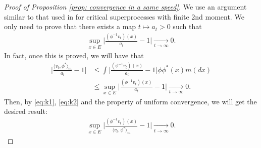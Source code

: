 \documentclass[12pt,a4paper]{amsart}
\theoremstyle{definition}
\numberwithin{equation}{section}
\begin{document}
\begin{proof}
  [Proof of Proposition \ref{prop: convergence in a same speed}]
	We use an argument similar to that used in \cite{RenSongSun2017Spine} for critical superprocesses with finite 2nd moment.
  We only need to prove that there exists a map $t\mapsto a_t > 0$ such that
  \begin{align}
    \label{eq:k1}
    \sup_{x\in E} \Big| \frac{ ( \phi^{-1} v_t )(x)}{ a_t} - 1 \Big|
    \xrightarrow[t\to \infty]{} 0.
  \end{align}
  In fact, once this is proved, we will have that
  \begin{align}
    \label{eq:k2}
    \Big |\frac {\langle v_t, \phi^*\rangle_m} {a_t } - 1 \Big |
    & \leq \int \Big | \frac{(\phi^{-1}v_t)(x)}{ a_t } - 1 \Big| \phi \phi^*(x) m(dx)\\
    & \leq \sup_{x\in E}\Big|\frac{(\phi^{-1}v_t)(x)}{ a_t }-1 \Big|
        \xrightarrow[t\to\infty]{} 0.
  \end{align}
  Then, by \eqref{eq:k1}, \eqref{eq:k2} and the property of uniform convergence, we will get the desired result:
  \begin{align}
    \sup_{x\in E}\Big|\frac{(\phi^{-1}v_t)(x)}{\langle v_{t},\phi^* \rangle_m}-1 \Big|
    \xrightarrow[t\to\infty]{} 0.
  \end{align}
	

\end{proof}
\end{document}
